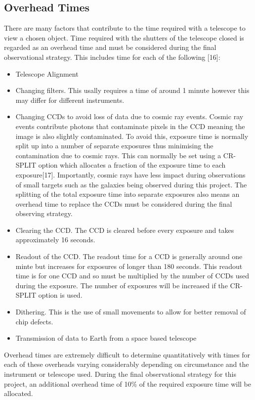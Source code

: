 \documentclass[pdf,color]{UoBnote}
\begin{document}
\subsection{Overhead Times}
There are many factors that contribute to the time required with a telescope to view a chosen object. Time required with the shutters of the telescope closed is regarded as an overhead time and must be considered during the final observational strategy. This includes time for each of the following [16]:
\begin{itemize}
\item Telescope Alignment
\item Changing filters. This usally requires a time of around 1 minute however this may differ for different instruments.
\item Changing CCDs to avoid loss of data due to cosmic ray events. Cosmic ray events contribute photons that contaminate pixels in the CCD meaning the image is also slightly contaminated. To avoid this, exposure time is normally split up into a number of separate exposures thus minimising the contamination due to cosmic rays. This can normally be set using a CR-SPLIT option which allocates a fraction of the exposure time to each exposure[17]. Importantly, cosmic rays have less impact during observations of small targets such as the galaxies being observed during this project. The splitting of the total exposure time into separate exposures also means an overhead time to replace the CCDs must be considered during the final observing strategy.
\item Clearing the CCD. The CCD is cleared before every exposure and takes approximately 16 seconds.
\item Readout of the CCD. The readout time for a CCD is generally around one minte but increases for exposures of longer than 180 seconds. This readout time is for one CCD and so must be multiplied by the number of CCDs used  during the exposure. The number of exposures will be increased if the CR-SPLIT option is used.
\item Dithering. This is the use of small movements to allow for better removal of chip defects.
\item Transmission of data to Earth from a space based telescope
\end{itemize}
\noindent
Overhead times are extremely difficult to determine quantitatively with times for each of these overheads varying considerably depending on circumstance and the instrument or telescope used. During the final observational strategy for this project, an additional overhead time of 10\% of the required exposure time will be allocated. \\
\end{document}
